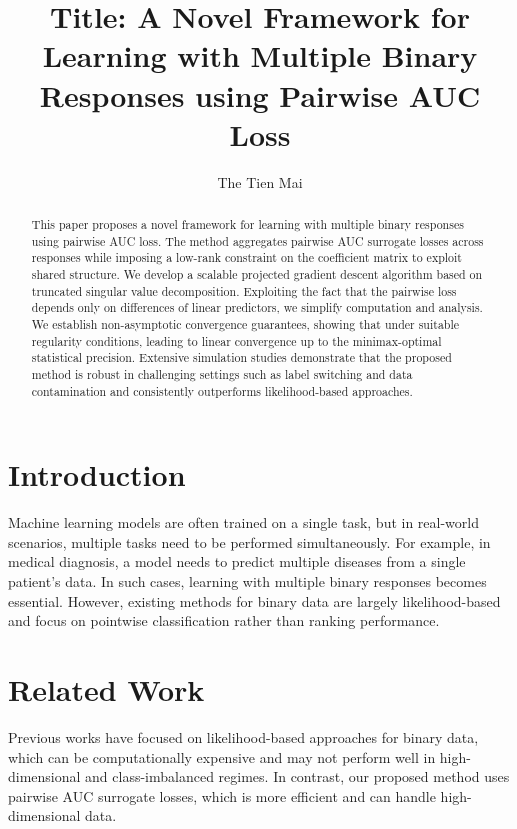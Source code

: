 \documentclass{article}
\begin{document}
\title{Title: A Novel Framework for Learning with Multiple Binary Responses using Pairwise AUC Loss}

\author{The Tien Mai}

\maketitle

\begin{abstract}
This paper proposes a novel framework for learning with multiple binary responses using pairwise AUC loss. The method aggregates pairwise AUC surrogate losses across responses while imposing a low-rank constraint on the coefficient matrix to exploit shared structure. We develop a scalable projected gradient descent algorithm based on truncated singular value decomposition. Exploiting the fact that the pairwise loss depends only on differences of linear predictors, we simplify computation and analysis. We establish non-asymptotic convergence guarantees, showing that under suitable regularity conditions, leading to linear convergence up to the minimax-optimal statistical precision. Extensive simulation studies demonstrate that the proposed method is robust in challenging settings such as label switching and data contamination and consistently outperforms likelihood-based approaches.
\end{abstract}

\section{Introduction}

Machine learning models are often trained on a single task, but in real-world scenarios, multiple tasks need to be performed simultaneously. For example, in medical diagnosis, a model needs to predict multiple diseases from a single patient's data. In such cases, learning with multiple binary responses becomes essential. However, existing methods for binary data are largely likelihood-based and focus on pointwise classification rather than ranking performance.

\section{Related Work}

Previous works have focused on likelihood-based approaches for binary data, which can be computationally expensive and may not perform well in high-dimensional and class-imbalanced regimes. In contrast, our proposed method uses pairwise AUC surrogate losses, which is more efficient and can handle high-dimensional data.
\end{document}
